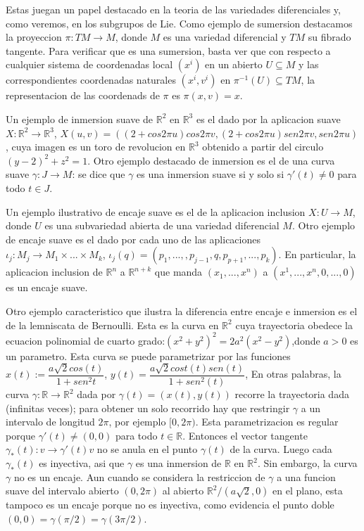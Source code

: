 \documentclass[12pt]{extarticle}
\newcommand{\R}{\mathbb{R}}
\newcommand{\<}{\langle}
\renewcommand{\>}{\rangle}
\theoremstyle{definition}
\begin{document}
Estas juegan un papel destacado en la teoria de las variedades diferenciales y,
como veremos, en los subgrupos de Lie. Como ejemplo de sumersion destacamos la
proyeccion $\pi : TM \rightarrow M$, donde $M$ es una variedad diferencial y
$TM$ su fibrado tangente. Para verificar que es una sumersion, basta ver que con
respecto a cualquier sistema de coordenadas local $(x^i)$ en un abierto $U
\subseteq M$ y las correspondientes coordenadas naturales $(x^i, v^i)$ en
$\pi^{-1}(U) \subseteq TM$, la representacion de las coordenads de $\pi$ es
$\pi(x, v) = x$.

Un ejemplo de inmersion suave de $\R^2$ en $\R^3$ es el dado por la aplicacion
suave $X: \R^2 \rightarrow \R^3$, $X(u, v) = ((2 + cos2 \pi u) cos2\pi v, (2 +
cos2\pi u)sen2\pi v, sen2\pi u)$, cuya imagen es un toro de revolucion en $\R^3$
obtenido a partir del circulo $(y - 2)^2 + z^2 = 1$. Otro ejemplo destacado de
inmersion es el de una curva suave $\gamma : J \rightarrow M$: se dice que
$\gamma$ es una inmersion suave si y solo si $\gamma'(t) \neq 0$ para todo $t
\in J$.

Un ejemplo ilustrativo de encaje suave es el de la aplicacion inclusion $X: U
\rightarrow M$, donde $U$ es una subvariedad abierta de una variedad diferencial
$M$. Otro ejemplo de encaje suave es el dado por cada uno de las aplicaciones
$\iota_j : M_j \rightarrow M_1 \times ... \times M_k$, $\iota_j(q) = (p_1, ...,,
p_{j-1}, q, p_{p+1},..., p_k)$. En particular, la aplicacion inclusion de $\R^n$
a $\R^{n+k}$ que manda $(x_1,..., x^n)$ a  $(x^1, ..., x^n, 0,..., 0)$ es un
encaje suave.


Otro ejemplo caracteristico que ilustra la diferencia entre encaje e inmersion
es el de la lemniscata de Bernoulli. Esta es la
curva en $\R^2$ cuya trayectoria obedece la ecuacion polinomial de cuarto
grado:$(x^2+y^2)^2 = 2a^2(x^2-y^2)$,donde $a>0$ es un parametro. Esta curva se puede
parametrizar por las funciones $x(t):=\dfrac{a\sqrt{2} cos(t)}{1+sen^2t}$,
$y(t) = \dfrac{a\sqrt{2}cost(t) sen(t)}{1+sen^2(t)}$,
En otras palabras, la curva $\gamma: \R \rightarrow \R^2$ dada por $\gamma(t) =
(x(t),y(t))$ recorre la trayectoria dada (infinitas veces); para obtener un solo
recorrido hay que restringir $\gamma$ a un intervalo de longitud $2\pi$, por
ejemplo $[0, 2\pi)$. Esta parametrizacion es regular porque $\gamma'(t) \neq (0,
0)$
para todo $t \in \R$. Entonces el vector tangente $\gamma_*(t): v \rightarrow
\gamma'(t)v$ no se anula en el punto $\gamma(t)$ de la curva. Luego cada
$\gamma_*(t)$ es inyectiva, asi que $\gamma$ es una inmersion de $\R$ en
$\R^2$. Sin embargo, la curva $\gamma$ no es un encaje. Aun cuando se considera
la restriccion de $\gamma$ a una funcion suave del intervalo abierto $(0, 2\pi)$
al abierto $\R^2/(a\sqrt{2}, 0)$ en el plano, esta tampoco es un
encaje porque no es inyectiva, como evidencia el punto doble $(0,
0)=\gamma(\pi/2)=\gamma(3\pi/2)$.
\end{document}
